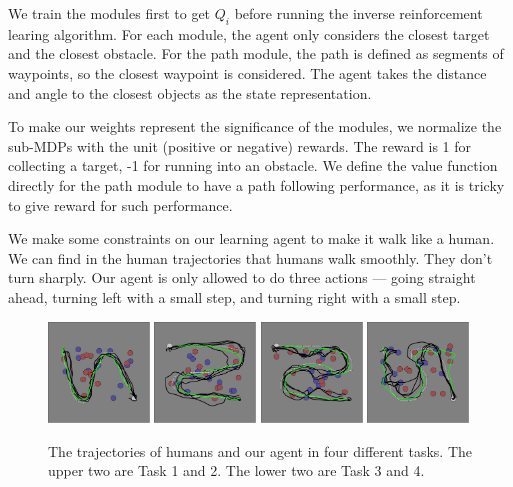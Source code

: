 \documentclass[11pt]{article} %
\begin{document}
We train the modules first to get $Q_i$ before running the inverse reinforcement
learing algorithm. For each module, the agent only considers the closest target
and the closest obstacle. For the path module, the path is defined as segments
of waypoints, so the closest waypoint is considered. The agent takes the
distance and angle to the closest objects as the state representation.

To make our weights represent the significance of the modules, we
normalize the sub-MDPs with the unit (positive or negative) rewards. The reward
is 1 for collecting a target, -1 for running into an obstacle. We define the
value function directly for the path module to have a path following
performance, as it is tricky to give reward for such performance.

We make some constraints on our learning agent to make it walk like a human.
We can find in the human trajectories that humans walk smoothly. They don't turn
sharply.  Our agent is only allowed to do three actions --- going straight ahead,
turning left with a small step, and turning right with a small step.

\begin{figure}[h!]
\centering
\includegraphics[width=0.24\textwidth]{task_1.png}
\includegraphics[width=0.24\textwidth]{task_2.png}
\includegraphics[width=0.24\textwidth]{task_3.png}
\includegraphics[width=0.24\textwidth]{task_4.png}
\caption{The trajectories of humans and our agent in four different tasks. The
upper two are Task 1 and 2. The lower two are Task 3 and 4.}
\label{fig:exp}
\end{figure}
\end{document}
